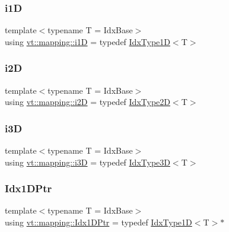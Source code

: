 \mbox{\label{namespacevt_1_1mapping_af0c14a9a77e0311b3d089143ed93ba76}} 
\subsubsection{\texorpdfstring{i1D}{i1D}}
{\footnotesize\ttfamily template$<$typename T  = Idx\+Base$>$ \\
using \hyperlink{namespacevt_1_1mapping_af0c14a9a77e0311b3d089143ed93ba76}{vt\+::mapping\+::i1D} = typedef \hyperlink{namespacevt_a36127c6500f2311908c959be653da40e}{Idx\+Type1D}$<$T$>$}

\mbox{\label{namespacevt_1_1mapping_a6448c875e0807b43f31e96fc5b0cec04}} 
\subsubsection{\texorpdfstring{i2D}{i2D}}
{\footnotesize\ttfamily template$<$typename T  = Idx\+Base$>$ \\
using \hyperlink{namespacevt_1_1mapping_a6448c875e0807b43f31e96fc5b0cec04}{vt\+::mapping\+::i2D} = typedef \hyperlink{namespacevt_ab0fbc5ddf69b5aa0ed6a8d1658b504eb}{Idx\+Type2D}$<$T$>$}

\mbox{\label{namespacevt_1_1mapping_af435b967b9ed1ccb5ec4effdbd9abd13}} 
\subsubsection{\texorpdfstring{i3D}{i3D}}
{\footnotesize\ttfamily template$<$typename T  = Idx\+Base$>$ \\
using \hyperlink{namespacevt_1_1mapping_af435b967b9ed1ccb5ec4effdbd9abd13}{vt\+::mapping\+::i3D} = typedef \hyperlink{namespacevt_a65e4a83c0567ecb7a54b78e9b8e7d7ab}{Idx\+Type3D}$<$T$>$}

\mbox{\label{namespacevt_1_1mapping_a8b576cf2f31069778e4951f64bccafd8}} 
\subsubsection{\texorpdfstring{Idx1\+D\+Ptr}{Idx1DPtr}}
{\footnotesize\ttfamily template$<$typename T  = Idx\+Base$>$ \\
using \hyperlink{namespacevt_1_1mapping_a8b576cf2f31069778e4951f64bccafd8}{vt\+::mapping\+::\+Idx1\+D\+Ptr} = typedef \hyperlink{namespacevt_a36127c6500f2311908c959be653da40e}{Idx\+Type1D}$<$T$>$$\ast$}

